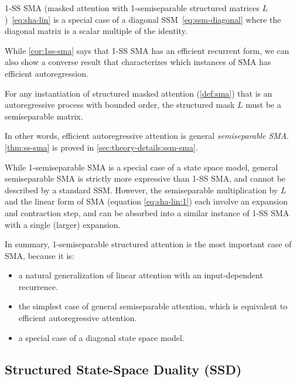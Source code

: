 \begin{corollary}
  \label{cor:1ss-sma}
  1-SS SMA (masked attention with 1-semiseparable structured matrices $L$)~\eqref{eq:sha-lin} is a special case of a diagonal SSM~\eqref{eq:ssm-diagonal} where the diagonal matrix is a scalar multiple of the identity.
\end{corollary}

While \ref{cor:1ss-sma} says that 1-SS SMA has an efficient recurrent form, we can also show a converse result that characterizes which instances of SMA has efficient autoregression.

\begin{theorem}
  \label{thm:ss-sma}
  For any instantiation of structured masked attention (\ref{def:sma}) that is an autoregressive process with bounded order, the structured mask $L$ must be a semiseparable matrix.
\end{theorem}

In other words, efficient autoregressive attention is general \emph{semiseparable SMA}.
\ref{thm:ss-sma} is proved in \ref{sec:theory-details:ssm-sma}.

\begin{remark}
  While 1-semiseparable SMA is a special case of a state space model, general semiseparable SMA is strictly more expressive than 1-SS SMA, and cannot be described by a standard SSM. However, the semiseparable multiplication by $L$ and the linear form of SMA (equation \eqref{eq:sha-lin:1}) each involve an expansion and contraction step, and can be absorbed into a similar instance of 1-SS SMA with a single (larger) expansion.
\end{remark}

In summary, 1-semiseparable structured attention is the most important case of SMA, because it is:

\begin{itemize}
  \item a natural generalization of linear attention with an input-dependent recurrence.
  \item the simplest case of general semiseparable attention, which is equivalent to efficient autoregressive attention.
  \item a special case of a diagonal state space model.
\end{itemize}

\subsection{Structured State-Space Duality (SSD)}
\label{sec:ssd:ssd}

